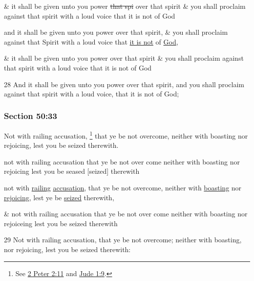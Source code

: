 		\begin{framed}
		\scriptsize
			\begin{compactdesc}
				\item[JSP] \& it shall be given unto you power \sout{that spi} over that spirit \& you shall proclaim against that spirit with a loud voice that it is not of God
				\item[Gilbert] and it shall be given unto you power over that spirit, \& you shall proclaim against that Spirit with a loud voice that \uline{it is not} of \uline{God},
				\item[Hyde and Smith] \& it shall be given unto you power over that spirit \& you shall proclaim against that spirit with a loud voice that it is not of God
				\item[BC] 28 And it shall be given unto you power over that spirit, and you shall proclaim against that spirit with a loud voice, that it is not of God;
			\end{compactdesc}
		\end{framed}

	\subsubsection{Section 50:33} %
		\label{DC50-33}

		Not with railing accusation,%
			\footnote{%
				See \hyperref[2PETER-2-11]{2 Peter 2:11} and \hyperref[JUDE-1-9]{Jude 1:9}.
				}
		that ye be not overcome, neither with boasting nor rejoicing, lest you be seized therewith.

		\begin{framed}
		\scriptsize
			\begin{compactdesc}
				\item[JSP] not with railing accusation that ye be not over come neither with boasting nor rejoicing lest you be seased [seized] therewith
				\item[Gilbert] not with \uline{railing} \uline{accusation}, that ye be not overcome, neither with \uline{boasting} nor \uline{rejoicing}, lest ye be \uline{seized} therewith,
				\item[Hyde and Smith] \& not with railing accusation that ye be not over come neither with boasting nor rejoiceing lest you be seized therewith
				\item[BC] 29 Not with railing accusation, that ye be not overcome; neither with boasting, nor rejoicing, lest you be seized therewith:
			\end{compactdesc}
		\end{framed}

